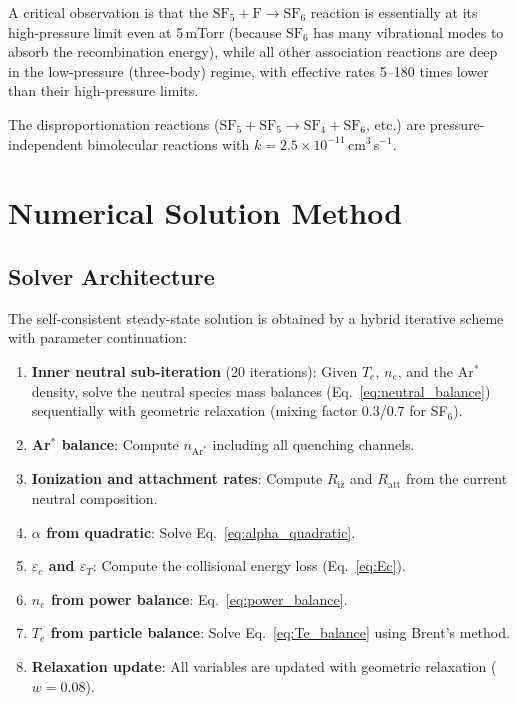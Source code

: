 \documentclass[11pt,a4paper]{article}
\newcommand{\SFsix}{\mathrm{SF}_6}
\newcommand{\SFfive}{\mathrm{SF}_5}
\newcommand{\SFfour}{\mathrm{SF}_4}
\newcommand{\Ar}{\mathrm{Ar}}
\newcommand{\Te}{T_e}
\newcommand{\ne}{n_e}
\begin{document}
A critical observation is that the $\SFfive + \mathrm{F} \to \SFsix$ reaction is essentially at its high-pressure limit even at 5\,mTorr (because $\SFsix$ has many vibrational modes to absorb the recombination energy), while all other association reactions are deep in the low-pressure (three-body) regime, with effective rates 5--180 times lower than their high-pressure limits.

The disproportionation reactions ($\SFfive + \SFfive \to \SFfour + \SFsix$, etc.) are pressure-independent bimolecular reactions with $k = 2.5 \times 10^{-11}$\,cm$^3$\,s$^{-1}$.

\section{Numerical Solution Method}

\subsection{Solver Architecture}

The self-consistent steady-state solution is obtained by a hybrid iterative scheme with parameter continuation:

\begin{enumerate}
\item \textbf{Inner neutral sub-iteration} (20 iterations): Given $\Te$, $\ne$, and the Ar$^*$ density, solve the neutral species mass balances (Eq.~\ref{eq:neutral_balance}) sequentially with geometric relaxation (mixing factor 0.3/0.7 for SF$_6$).
\item \textbf{Ar$^*$ balance}: Compute $n_{\Ar^*}$ including all quenching channels.
\item \textbf{Ionization and attachment rates}: Compute $R_\mathrm{iz}$ and $R_\mathrm{att}$ from the current neutral composition.
\item \textbf{$\alpha$ from quadratic}: Solve Eq.~\eqref{eq:alpha_quadratic}.
\item \textbf{$\varepsilon_c$ and $\varepsilon_T$}: Compute the collisional energy loss (Eq.~\ref{eq:Ec}).
\item \textbf{$\ne$ from power balance}: Eq.~\eqref{eq:power_balance}.
\item \textbf{$\Te$ from particle balance}: Solve Eq.~\eqref{eq:Te_balance} using Brent's method.
\item \textbf{Relaxation update}: All variables are updated with geometric relaxation ($w = 0.08$).
\end{enumerate}
\end{document}
